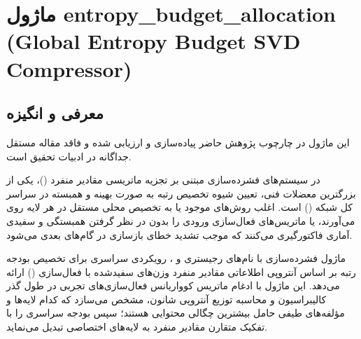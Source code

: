 \section{ماژول entropy\_budget\_allocation (Global Entropy Budget SVD Compressor)}
\label{sec:module_entropy_budget_allocation}

\subsection{معرفی و انگیزه}
این ماژول در چارچوب پژوهش حاضر پیاده‌سازی و ارزیابی شده و فاقد مقاله مستقل جداگانه در ادبیات تحقیق است.

در سیستم‌های فشرده‌سازی مبتنی بر تجزیه ماتریسی مقادیر منفرد ()، یکی از بزرگترین معضلات فنی، تعیین شیوه تخصیص رتبه به صورت بهینه و همبسته در سراسر کل شبکه () است. اغلب روش‌های موجود یا به تخصیص محلی مستقل در هر لایه روی می‌آورند، یا ماتریس‌های فعال‌سازی ورودی را بدون در نظر گرفتن همبستگی و سفیدی آماری فاکتورگیری می‌کنند که موجب تشدید خطای بازسازی در گام‌های بعدی می‌شود.

ماژول فشرده‌سازی  با نام‌های رجیستری  و ، رویکردی سراسری برای تخصیص بودجه رتبه بر اساس آنتروپی اطلاعاتی مقادیر منفرد وزن‌های سفیدشده با فعال‌سازی () ارائه می‌دهد. این ماژول با ادغام ماتریس کوواریانس فعال‌سازی‌های تجربی در طول گذر کالیبراسیون و محاسبه توزیع آنتروپی شانون، مشخص می‌سازد که کدام لایه‌ها و مؤلفه‌های طیفی حامل بیشترین چگالی محتوایی هستند؛ سپس بودجه سراسری را با تفکیک متقارن مقادیر منفرد به لایه‌های اختصاصی  تبدیل می‌نماید.

